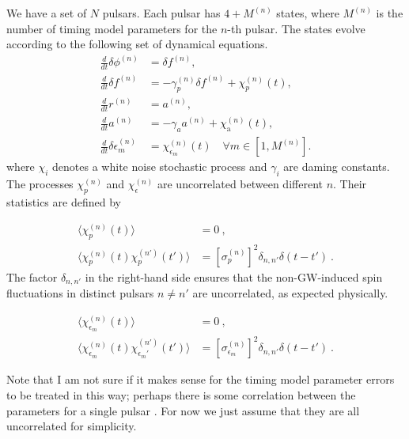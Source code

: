 \documentclass[]{scrartcl}
\begin{document}
We have a set of $N$ pulsars. Each pulsar has $4 + M^{(n)}$ states, where $M^{(n)}$ is the number of timing model parameters for the $n$-th pulsar. The states evolve according to the following set of dynamical equations.
\begin{align}
	\frac{d}{dt} \delta \phi^{(n)} &= \delta f^{(n)}, \\
	\frac{d}{dt} \delta f^{(n)} &= -\gamma_p^{(n)} \delta f^{(n)} + \chi_p^{(n)}(t), \\
	\frac{d}{dt} r^{(n)} &= a^{(n)}, \\
	\frac{d}{dt} a^{(n)} &= -\gamma_a a^{(n)} + \chi_{\mathrm a}^{(n)}(t), \\
	\frac{d}{dt} \delta \epsilon^{(n)}_{m} &= \chi_{\epsilon_{m}}^{(n)}(t) \quad \forall m \in [1, M^{(n)}].
\end{align}
where $\chi_{i}$ denotes a white noise stochastic process and $\gamma_i$ are daming constants. The processes  $\chi_p^{(n)}$ and  $\chi_\epsilon^{(n)}$ are uncorrelated between different $n$. Their statistics are defined by

\begin{align}
	\langle \chi_p^{(n)}(t) \rangle &= 0 \ , \\
	\langle \chi_p^{(n)}(t) \chi_p^{(n')}(t') \rangle &= [\sigma_p^{(n)}]^2 \delta_{n,n'} \delta(t - t') \ .
\end{align}
The factor $\delta_{n,n'}$ in the right-hand side ensures that the non-GW-induced spin fluctuations in distinct pulsars $n\neq n'$ are uncorrelated, as expected physically. 

\begin{align}
	\langle \chi_{\epsilon_m}^{(n)}(t) \rangle &= 0 \ , \\
	\langle \chi_{\epsilon_m}^{(n)}(t) \chi_{\epsilon_m'}^{(n')}(t') \rangle &= [\sigma_{\epsilon_m}^{(n)}]^2 \delta_{n,n'} \delta(t - t') \ .
\end{align}

Note that I am not sure if it makes sense for the timing model parameter errors to be treated in this way; perhaps there is some correlation between the parameters for a single pulsar . For now we just assume that they are all uncorrelated for simplicity. \newline 
\end{document}
